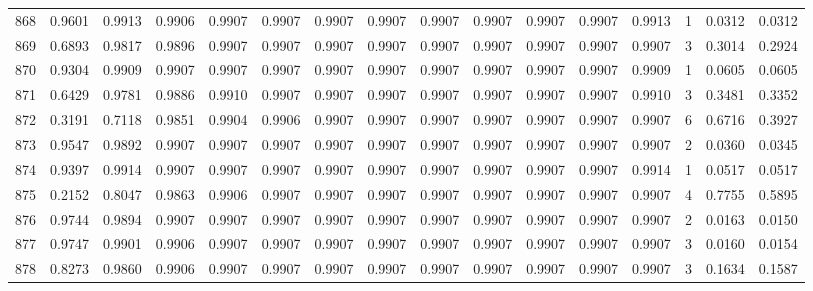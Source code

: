 \begin{tabular}{lrrrrrrrrrrrrrrr}
868 &      0.9601 &  0.9913 &  0.9906 &  0.9907 &  0.9907 &  0.9907 &  0.9907 &  0.9907 &  0.9907 &  0.9907 &   0.9907 &     0.9913 &      1 &                    0.0312 &                     0.0312 \\
869 &      0.6893 &  0.9817 &  0.9896 &  0.9907 &  0.9907 &  0.9907 &  0.9907 &  0.9907 &  0.9907 &  0.9907 &   0.9907 &     0.9907 &      3 &                    0.3014 &                     0.2924 \\
870 &      0.9304 &  0.9909 &  0.9907 &  0.9907 &  0.9907 &  0.9907 &  0.9907 &  0.9907 &  0.9907 &  0.9907 &   0.9907 &     0.9909 &      1 &                    0.0605 &                     0.0605 \\
871 &      0.6429 &  0.9781 &  0.9886 &  0.9910 &  0.9907 &  0.9907 &  0.9907 &  0.9907 &  0.9907 &  0.9907 &   0.9907 &     0.9910 &      3 &                    0.3481 &                     0.3352 \\
872 &      0.3191 &  0.7118 &  0.9851 &  0.9904 &  0.9906 &  0.9907 &  0.9907 &  0.9907 &  0.9907 &  0.9907 &   0.9907 &     0.9907 &      6 &                    0.6716 &                     0.3927 \\
873 &      0.9547 &  0.9892 &  0.9907 &  0.9907 &  0.9907 &  0.9907 &  0.9907 &  0.9907 &  0.9907 &  0.9907 &   0.9907 &     0.9907 &      2 &                    0.0360 &                     0.0345 \\
874 &      0.9397 &  0.9914 &  0.9907 &  0.9907 &  0.9907 &  0.9907 &  0.9907 &  0.9907 &  0.9907 &  0.9907 &   0.9907 &     0.9914 &      1 &                    0.0517 &                     0.0517 \\
875 &      0.2152 &  0.8047 &  0.9863 &  0.9906 &  0.9907 &  0.9907 &  0.9907 &  0.9907 &  0.9907 &  0.9907 &   0.9907 &     0.9907 &      4 &                    0.7755 &                     0.5895 \\
876 &      0.9744 &  0.9894 &  0.9907 &  0.9907 &  0.9907 &  0.9907 &  0.9907 &  0.9907 &  0.9907 &  0.9907 &   0.9907 &     0.9907 &      2 &                    0.0163 &                     0.0150 \\
877 &      0.9747 &  0.9901 &  0.9906 &  0.9907 &  0.9907 &  0.9907 &  0.9907 &  0.9907 &  0.9907 &  0.9907 &   0.9907 &     0.9907 &      3 &                    0.0160 &                     0.0154 \\
878 &      0.8273 &  0.9860 &  0.9906 &  0.9907 &  0.9907 &  0.9907 &  0.9907 &  0.9907 &  0.9907 &  0.9907 &   0.9907 &     0.9907 &      3 &                    0.1634 &                     0.1587 \\

\end{tabular}
